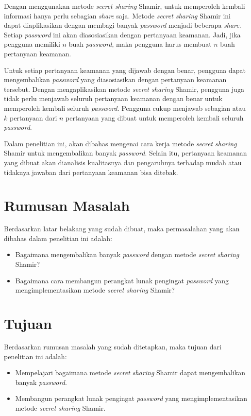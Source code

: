Dengan menggunakan metode \textit{secret sharing} Shamir, untuk memperoleh kembali informasi hanya perlu sebagian \textit{share} saja. Metode \textit{secret sharing} Shamir ini dapat diaplikasikan dengan membagi banyak \textit{password} menjadi beberapa \textit{share}. Setiap \textit{password} ini akan diasosiasikan dengan pertanyaan keamanan. Jadi, jika pengguna memiliki $n$ buah \textit{password}, maka pengguna harus membuat $n$ buah pertanyaan keamanan.

Untuk setiap pertanyaan keamanan yang dijawab dengan benar, pengguna dapat mengembalikan \textit{password} yang diasosiasikan dengan pertanyaan keamanan tersebut. Dengan mengaplikasikan metode \textit{secret sharing} Shamir, pengguna juga tidak perlu menjawab seluruh pertanyaan keamanan dengan benar untuk memperoleh kembali seluruh \textit{password}. Pengguna cukup menjawab sebagian atau $k$ pertanyaan dari $n$ pertanyaan yang dibuat untuk memperoleh kembali seluruh \textit{password}.

Dalam penelitian ini, akan dibahas mengenai cara kerja metode \textit{secret sharing} Shamir untuk mengembalikan banyak \textit{password}. Selain itu, pertanyaan keamanan yang dibuat akan dianalisis kualitasnya dan pengaruhnya terhadap mudah atau tidaknya jawaban dari pertanyaan keamanan bisa ditebak.

\section{Rumusan Masalah}
\label{sec:rumusan masalah}

Berdasarkan latar belakang yang sudah dibuat, maka permasalahan yang akan dibahas dalam penelitian ini adalah:
\begin{itemize}
	\item Bagaimana mengembalikan banyak \textit{password} dengan metode \textit{secret sharing} Shamir?
	\item Bagaimana cara membangun perangkat lunak pengingat \textit{password} yang mengimplementasikan metode \textit{secret sharing} Shamir?
\end{itemize}

\section{Tujuan}
\label{sec:tujuan}

Berdasarkan rumusan masalah yang sudah ditetapkan, maka tujuan dari penelitian ini adalah:
\begin{itemize}
	\item Mempelajari bagaimana metode \textit{secret sharing} Shamir dapat mengembalikan banyak \textit{password}.
	\item Membangun perangkat lunak pengingat \textit{password} yang mengimplementasikan metode \textit{secret sharing} Shamir.
\end{itemize}

